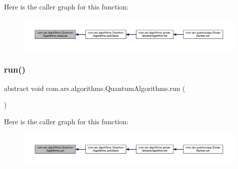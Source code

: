 Here is the caller graph for this function\+:\nopagebreak
\begin{figure}[H]
\begin{center}
\leavevmode
\includegraphics[width=350pt]{classcom_1_1ars_1_1algorithms_1_1_quantum_algorithms_afcae7e993d2d70942a7ffd6485c44b1e_icgraph}
\end{center}
\end{figure}
\hypertarget{classcom_1_1ars_1_1algorithms_1_1_quantum_algorithms_ae36bd570c176a3f11b6a3ef666d49a9d}{}\label{classcom_1_1ars_1_1algorithms_1_1_quantum_algorithms_ae36bd570c176a3f11b6a3ef666d49a9d} 
\subsubsection{\texorpdfstring{run()}{run()}}
{\footnotesize\ttfamily abstract void com.\+ars.\+algorithms.\+Quantum\+Algorithms.\+run (\begin{DoxyParamCaption}{ }\end{DoxyParamCaption})\hspace{0.3cm}{\ttfamily [abstract]}}

Here is the caller graph for this function\+:\nopagebreak
\begin{figure}[H]
\begin{center}
\leavevmode
\includegraphics[width=350pt]{classcom_1_1ars_1_1algorithms_1_1_quantum_algorithms_ae36bd570c176a3f11b6a3ef666d49a9d_icgraph}
\end{center}
\end{figure}
\hypertarget{classcom_1_1ars_1_1algorithms_1_1_quantum_algorithms_a71cfe9109e3a0ff9c2b7e5d4cc16c4d8}{}\label{classcom_1_1ars_1_1algorithms_1_1_quantum_algorithms_a71cfe9109e3a0ff9c2b7e5d4cc16c4d8} 
